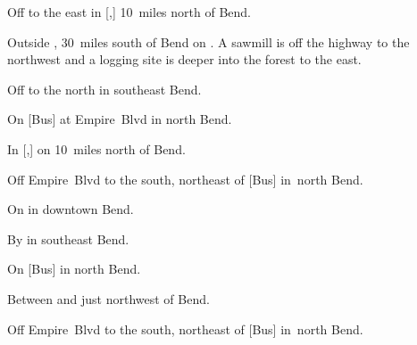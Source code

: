 

\begin{LocationList}

Off  to the east in [,] 10~miles north of Bend.

Outside , 30~miles south of Bend on .
A sawmill is off the highway to the northwest and a logging site is deeper into the forest to the east.

Off  to the north in southeast Bend.

\Location{\GarageHQ \Garage}
On  [Bus] at Empire~Blvd in north Bend.

\Location{\GasStation \Gas \Rest}
In [,] on  10~miles north of Bend.

Off Empire~Blvd to the south, northeast of  [Bus] in~north Bend.

On  in downtown Bend.

By  in southeast Bend.

\Location{\RecruitmentAgency \Recruitment}
On  [Bus] in north Bend.

Between  and  just northwest of Bend.

Off Empire~Blvd to the south, northeast of  [Bus] in~north Bend.

\end{LocationList}
